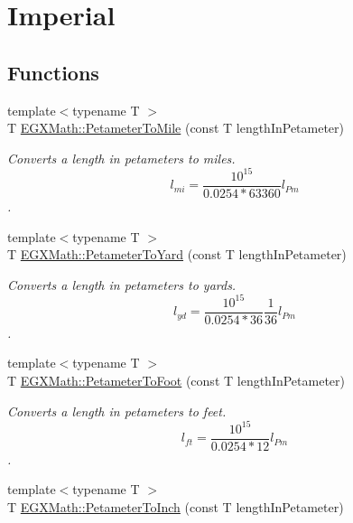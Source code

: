 \hypertarget{group___e_g_x_math-_conversions-_length_conversions-_petameter-_imperial}{}\section{Imperial}
\label{group___e_g_x_math-_conversions-_length_conversions-_petameter-_imperial}
\subsection*{Functions}
\begin{DoxyCompactItemize}
\item 
{\footnotesize template$<$typename T $>$ }\\T \mbox{\hyperlink{group___e_g_x_math-_conversions-_length_conversions-_petameter-_imperial_ga3aa40ba19c1425ed3473c605cf7d4478}{E\+G\+X\+Math\+::\+Petameter\+To\+Mile}} (const T length\+In\+Petameter)
\begin{DoxyCompactList}\small\item\em Converts a length in petameters to miles. \[ l_{mi}=\frac{10^{15}}{0.0254 * 63360} l_{Pm} \]. \end{DoxyCompactList}\item 
{\footnotesize template$<$typename T $>$ }\\T \mbox{\hyperlink{group___e_g_x_math-_conversions-_length_conversions-_petameter-_imperial_gadd453d20eef89db280c71397046d5dcd}{E\+G\+X\+Math\+::\+Petameter\+To\+Yard}} (const T length\+In\+Petameter)
\begin{DoxyCompactList}\small\item\em Converts a length in petameters to yards. \[ l_{yd}= \frac{10^{15}}{0.0254 * 36} \frac{1}{36} l_{Pm} \]. \end{DoxyCompactList}\item 
{\footnotesize template$<$typename T $>$ }\\T \mbox{\hyperlink{group___e_g_x_math-_conversions-_length_conversions-_petameter-_imperial_gab1b79668a9de6a8374601bb44dde250d}{E\+G\+X\+Math\+::\+Petameter\+To\+Foot}} (const T length\+In\+Petameter)
\begin{DoxyCompactList}\small\item\em Converts a length in petameters to feet. \[ l_{ft}= \frac{10^{15}}{0.0254 * 12} l_{Pm} \]. \end{DoxyCompactList}\item 
{\footnotesize template$<$typename T $>$ }\\T \mbox{\hyperlink{group___e_g_x_math-_conversions-_length_conversions-_petameter-_imperial_ga8e0128613c738b54c64e5bdd37f41b5b}{E\+G\+X\+Math\+::\+Petameter\+To\+Inch}} (const T length\+In\+Petameter)

\end{DoxyCompactItemize}
